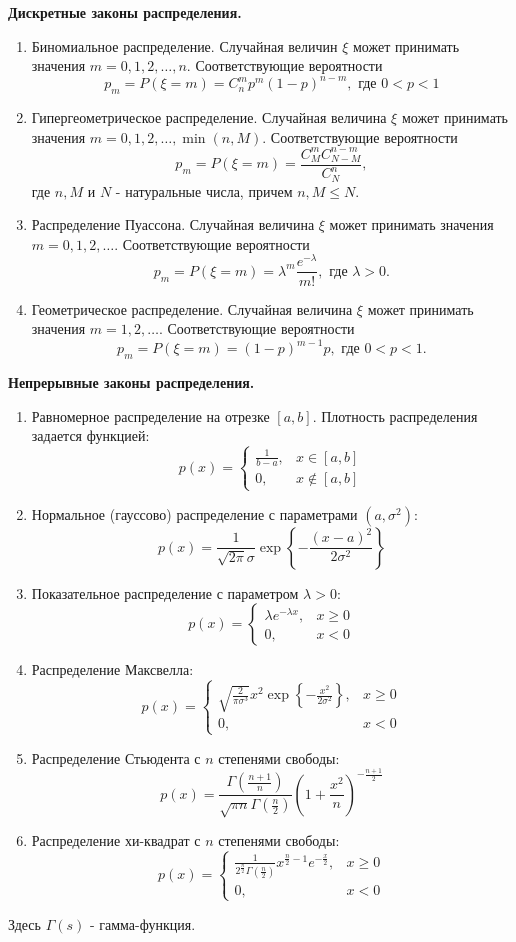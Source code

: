 \textbf{Дискретные законы распределения.}
\begin{enumerate}
	\item Биномиальное распределение. Случайная величин $\xi$ может принимать значения $m = 0,1,2,\dots,n$. Соответствующие вероятности
	\[ p_m = P(\xi = m) = C_n^m p^m (1-p)^{n-m}, \text{ где } 0 < p < 1 \]
	\item Гипергеометрическое распределение. Случайная величина $\xi$ может принимать значения $m = 0,1,2,\dots, \min (n, M)$. Соответствующие вероятности
	\[ p_m = P(\xi = m) = \frac{C_M^mC_{N-M}^{n-m}}{C_N^n}, \]
	где $n, M$ и $N$ - натуральные числа, причем $n, M \le N$.
	\item Распределение Пуассона. Случайная величина $\xi$ может принимать значения $m = 0,1,2,\dots$. Соответствующие вероятности
	\[ p_m = P(\xi = m) = \lambda^m \frac{e^{- \lambda}}{m!}, \text{ где } \lambda > 0. \]
	\item Геометрическое распределение. Случайная величина $\xi$ может принимать значения $m = 1,2,\dots$. Соответствующие вероятности
	\[ p_m = P(\xi = m) = (1 - p)^{m-1}p, \text{ где } 0 < p < 1. \]
\end{enumerate}
\textbf{Непрерывные законы распределения.}
\begin{enumerate}
	\item Равномерное распределение на отрезке $[a, b]$. Плотность распределения задается функцией:
	\[
	p(x) =
	\begin{cases}
		\frac{1}{b-a}, &x \in [a, b] \\
		0, &x \notin [a, b]
	\end{cases}
	\]
	\item Нормальное (гауссово) распределение с параметрами $(a, \sigma^2)$:
	\[ p(x) = \frac{1}{\sqrt{2 \pi} \sigma} \exp \left\{ - \frac{(x-a)^2}{2 \sigma^2} \right\} \]
	\item Показательное распределение с параметром $\lambda > 0$:
	\[
	p(x) =
	\begin{cases}
		\lambda e^{- \lambda x}, &x \ge 0 \\
		0, &x  < 0
	\end{cases}
	\]
	\item Распределение Максвелла:
	\[
	p(x) =
	\begin{cases}
		\sqrt{\frac{2}{\pi \sigma^3}} x^2 \exp \left\{ - \frac{x^2}{2 \sigma^2} \right\}, &x \ge 0 \\
		0, &x < 0
	\end{cases}
	\]
	\item Распределение Стьюдента с $n$ степенями свободы:
	\[ p(x) = \frac{\Gamma \left( \frac{n+1}{n} \right)}{\sqrt{\pi n} \Gamma \left(\frac{n}{2}\right)} \left( 1 +  \frac{x^2}{n} \right)^{-\frac{n+1}{2}} \]
	\item Распределение хи-квадрат с $n$ степенями свободы:
	\[
	p(x) =
	\begin{cases}
		\frac{1}{2^{\frac{n}{2}} \Gamma \left(\frac{n}{2}\right)} x^{\frac{n}{2} - 1} e^{- \frac{x}{2}}, &x \ge 0 \\
		0, &x < 0
	\end{cases}
	\]
\end{enumerate}
Здесь $\Gamma(s)$ - гамма-функция.

